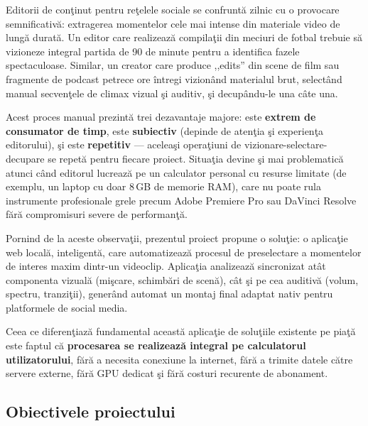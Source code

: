 \documentclass[12pt,a4paper]{article}
\begin{document}
Editorii de con\c{t}inut pentru re\c{t}elele sociale se confrunt\u{a}{} zilnic cu o provocare semnificativ\u{a}: extragerea momentelor cele mai intense din materiale video de lung\u{a}{} durat\u{a}. Un editor care realizeaz\u{a}{} compila\c{t}ii din meciuri de fotbal trebuie s\u{a}{} vizioneze integral partida de 90 de minute pentru a identifica fazele spectaculoase. Similar, un creator care produce ,,edits'' din scene de film sau fragmente de podcast petrece ore \^{i}ntregi vizion\^{a}nd materialul brut, select\^{a}nd manual secven\c{t}ele de climax vizual \c{s}i auditiv, \c{s}i decup\^{a}ndu-le una c\^{a}te una.

Acest proces manual prezint\u{a}{} trei dezavantaje majore: este \textbf{extrem de consumator de timp}, este \textbf{subiectiv} (depinde de aten\c{t}ia \c{s}i experien\c{t}a editorului), \c{s}i este \textbf{repetitiv} --- acelea\c{s}i opera\c{t}iuni de vizionare-selectare-decupare se repet\u{a}{} pentru fiecare proiect. Situa\c{t}ia devine \c{s}i mai problematic\u{a}{} atunci c\^{a}nd editorul lucreaz\u{a}{} pe un calculator personal cu resurse limitate (de exemplu, un laptop cu doar 8\,GB de memorie RAM), care nu poate rula instrumente profesionale grele precum Adobe Premiere Pro sau DaVinci Resolve f\u{a}r\u{a}{} compromisuri severe de performan\c{t}\u{a}.

Pornind de la aceste observa\c{t}ii, prezentul proiect propune o solu\c{t}ie: o aplica\c{t}ie web local\u{a}, inteligent\u{a}, care automatizeaz\u{a}{} procesul de preselectare a momentelor de interes maxim dintr-un videoclip. Aplica\c{t}ia analizeaz\u{a}{} sincronizat at\^{a}t componenta vizual\u{a}{} (mi\c{s}care, schimb\u{a}ri de scen\u{a}), c\^{a}t \c{s}i pe cea auditiv\u{a}{} (volum, spectru, tranzi\c{t}ii), gener\^{a}nd automat un montaj final adaptat nativ pentru platformele de social media.

Ceea ce diferen\c{t}iaz\u{a}{} fundamental aceast\u{a}{} aplica\c{t}ie de solu\c{t}iile existente pe pia\c{t}\u{a}{} este faptul c\u{a}{} \textbf{procesarea se realizeaz\u{a}{} integral pe calculatorul utilizatorului}, f\u{a}r\u{a}{} a necesita conexiune la internet, f\u{a}r\u{a}{} a trimite datele c\u{a}tre servere externe, f\u{a}r\u{a}{} GPU dedicat \c{s}i f\u{a}r\u{a}{} costuri recurente de abonament.

\subsection{Obiectivele proiectului}
\end{document}
